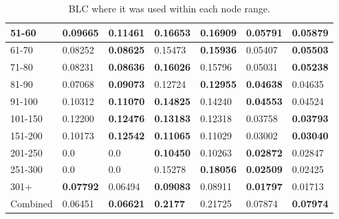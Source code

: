 \begin{table*}[h!]
\begin{tabular}{|l|l|l||l|l||l|l|}
        51-60     & 0.09665                                 & \textbf{0.11461}               & 0.16653                          & \textbf{0.16909} & 0.05791          & \textbf{0.05879} \\ \hline
        61-70     & 0.08252                                 & \textbf{0.08625}               & 0.15473                          & \textbf{0.15936} & 0.05407          & \textbf{0.05503} \\ \hline
        71-80     & 0.08231                                 & \textbf{0.08636}               & \textbf{0.16026}                 & 0.15796          & 0.05031          & \textbf{0.05238} \\ \hline
        81-90     & 0.07068                                 & \textbf{0.09073}               & 0.12724                          & \textbf{0.12955} & \textbf{0.04638} & 0.04635          \\ \hline
        91-100    & 0.10312                                 & \textbf{0.11070}               & \textbf{0.14825}                 & 0.14240          & \textbf{0.04553} & 0.04524          \\ \hline
        101-150   & 0.12200                                 & \textbf{0.12476}               & \textbf{0.13183}                 & 0.12318          & 0.03758          & \textbf{0.03793} \\ \hline
        151-200   & 0.10173                                 & \textbf{0.12542}               & \textbf{0.11065}                 & 0.11029          & 0.03002          & \textbf{0.03040} \\ \hline
        201-250   & 0.0                                     & 0.0                            & \textbf{0.10450}                 & 0.10263          & \textbf{0.02872} & 0.02847          \\ \hline
        251-300   & 0.0                                     & 0.0                            & 0.15278                          & \textbf{0.18056} & \textbf{0.02509} & 0.02425          \\ \hline
        301+      & \textbf{0.07792}                        & 0.06494                        & \textbf{0.09083}                 & 0.08911          & \textbf{0.01797} & 0.01713          \\ \hline
        Combined  & 0.06451                                 & \textbf{0.06621}               & \textbf{0.2177 }                 & 0.21725          & 0.07874          & \textbf{0.07974} \\ \hline
    \end{tabular}
        \caption{BLC where it was used within each node range.}
    \label{tab:BLC-degree-based-recall}
\end{table*}

